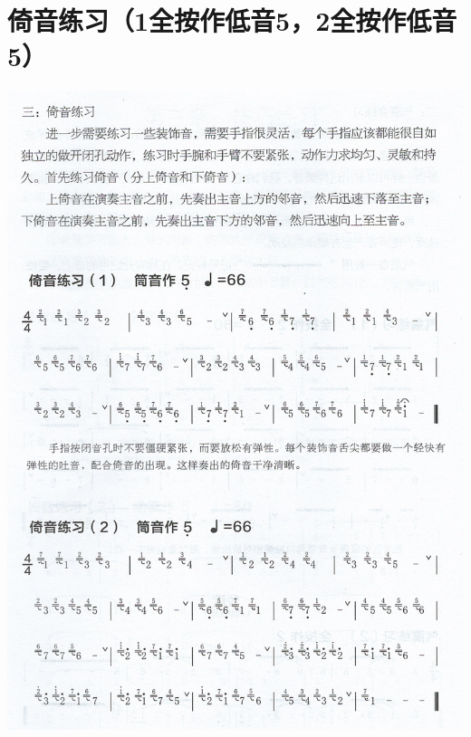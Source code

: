 \documentclass[cn,pad,chinese,chinesefont=nofont]{elegantbook}
\begin{document}
\section{倚音练习（1全按作低音5，2全按作低音5）}
\includegraphics[height=\textheight]{dongxiao/Scan 9.jpeg}
\end{document}
